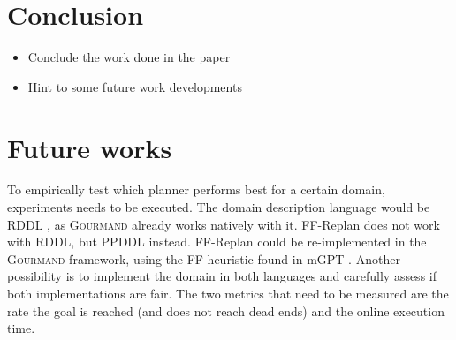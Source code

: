 \documentclass[runningheads,a4paper]{llncs}
\begin{document}
%
%
%




\section{Conclusion}

\begin{itemize}
	\item Conclude the work done in the paper
	\item Hint to some future work developments
\end{itemize}


\section{Future works}

To empirically test which planner performs best for a certain domain,
experiments needs to be executed. The domain description language would be RDDL
\cite{Sanner:RDDL}, as \textsc{Gourmand} already works natively with it.
FF-Replan does not work with RDDL, but PPDDL instead. FF-Replan could be
re-implemented in the \textsc{Gourmand} framework, using the FF heuristic found
in mGPT \cite{bonet2011planning}. Another possibility is to implement the
domain in both languages and carefully assess if both implementations are fair.
The two metrics that need to be measured are the rate the goal is reached (and does
not reach dead ends) and the online execution time.



\end{document}
